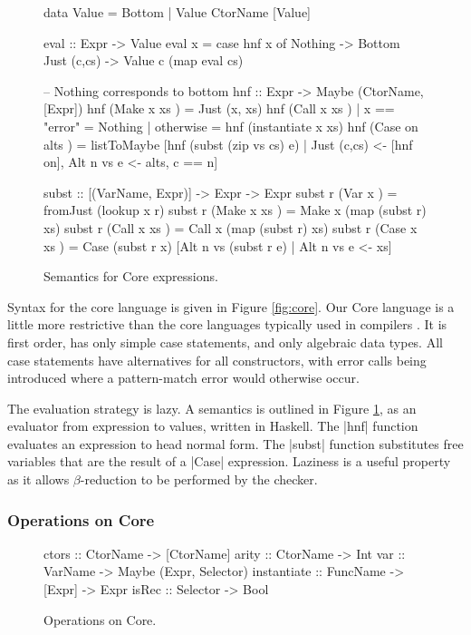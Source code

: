 \documentclass[preprint]{sigplanconf}
\newcommand{\C}[1]{\textsf{#1}}
\begin{document}
\begin{figure}
\begin{code}
data Value = Bottom | Value CtorName [Value]

eval :: Expr -> Value
eval x = case  hnf x of
               Nothing      -> Bottom
               Just (c,cs)  -> Value c (map eval cs)

-- Nothing corresponds to bottom
hnf :: Expr -> Maybe (CtorName, [Expr])
hnf (Make  x   xs    )  =  Just (x, xs)
hnf (Call  x   xs    )  |  x == "error"  = Nothing
                        |  otherwise     = hnf (instantiate x xs)
hnf (Case  on  alts  )  =  listToMaybe [hnf (subst (zip vs cs) e)
       | Just (c,cs) <- [hnf on], Alt n vs e <- alts, c == n]

subst :: [(VarName, Expr)] -> Expr -> Expr
subst r (Var   x     ) = fromJust (lookup x r)
subst r (Make  x xs  ) = Make  x (map (subst r) xs)
subst r (Call  x xs  ) = Call  x (map (subst r) xs)
subst r (Case  x xs  ) = Case (subst r x)
    [Alt n vs (subst r e) | Alt n vs e <- xs]
\end{code}
\caption{Semantics for Core expressions.}
\label{fig:semantics}
\end{figure}

Syntax for the core language is given in Figure \ref{fig:core}. Our Core language is a little more restrictive than the core languages typically used in compilers \citep{ghc_core}. It is first order, has only simple case statements, and only algebraic data types. All case statements have alternatives for all constructors, with \C{error} calls being introduced where a pattern-match error would otherwise occur.

The evaluation strategy is lazy. A semantics is outlined in Figure \ref{fig:semantics}, as an evaluator from expression to values, written in Haskell. The |hnf| function evaluates an expression to head normal form. The |subst| function substitutes free variables that are the result of a |Case| expression. Laziness is a useful property as it allows $\beta$-reduction to be performed by the checker.

\subsubsection{Operations on Core}

\begin{figure}
\begin{code}
ctors        :: CtorName  -> [CtorName]
arity        :: CtorName  -> Int
var          :: VarName   -> Maybe (Expr, Selector)
instantiate  :: FuncName  -> [Expr] -> Expr
isRec        :: Selector  -> Bool
\end{code}
\caption{Operations on Core.}
\label{fig:core_operations}
\end{figure}
\end{document}
